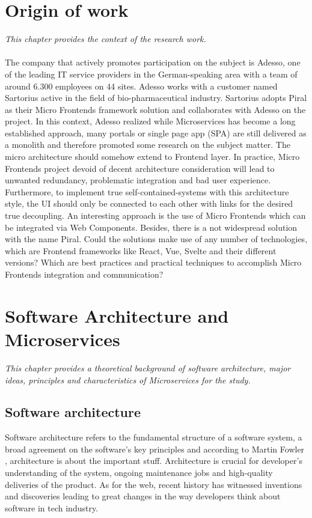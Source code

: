 \documentclass[a4paper]{book}
\begin{document}
\chapter{Origin of work}
\textit{This chapter provides the context of the research work.} 
\\ \\
The company that actively promotes participation on the subject is Adesso, one of the leading IT service providers in the German-speaking area with a team of around 6.300 employees on 44 sites. Adesso works with a customer named Sartorius active in the field of bio-pharmaceutical industry. Sartorius adopts Piral as their Micro Frontends framework solution and collaborates with Adesso on the project. In this context, Adesso realized while Microservices has become a long established approach, many portals or single page app (SPA) are still delivered as a monolith and therefore promoted some research on the subject matter. The micro architecture should somehow extend to Frontend layer. In practice, Micro Frontends project devoid of decent architecture consideration will lead to unwanted redundancy, problematic integration and bad user experience. Furthermore, to implement true self-contained-systems with this architecture style, the UI should only be connected to each other with links for the desired true decoupling. An interesting approach is the use of Micro Frontends which can be integrated via Web Components. Besides, there is a not widespread solution with the name Piral.  Could the solutions make use of any number of technologies, which are Frontend frameworks like React, Vue, Svelte and their different versions? Which are best practices and practical techniques to accomplish Micro Frontends integration and communication?


\chapter{Software Architecture and Microservices}
\textit{This chapter provides a theoretical background of software architecture, major ideas, principles and characteristics of Microservices for the study.}
\section{Software architecture}
Software architecture refers to the fundamental structure of a software system, a broad agreement on the software's key principles and according to Martin Fowler \cite{SA}, architecture is about the important stuff. Architecture is crucial for developer's understanding of the system, ongoing maintenance jobs and high-quality deliveries of the product. As for the web, recent history has witnessed inventions and discoveries leading to great changes in the way developers think about software in tech industry.
\end{document}
